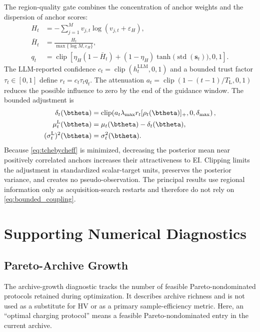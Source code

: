 The region-quality gate combines the concentration of anchor weights and the
dispersion of anchor scores:
\begin{equation}
\begin{aligned}
H_t&=-\sum_{j=1}^{M}v_{j,t}\log(v_{j,t}+\varepsilon_H),\\
\bar H_t&=\frac{H_t}{\max\{\log M,\varepsilon_H\}},\\
q_t&=\operatorname{clip}\!\left[
\eta_H(1-\bar H_t)
+(1-\eta_H)\tanh\!\bigl(\operatorname{std}(\mathbf s_t)\bigr),
0,1\right].
\end{aligned}
\label{eq:quality_gate}
\end{equation}
The LLM-reported confidence
$c_t=\operatorname{clip}(h_t^{\mathrm{LLM}},0,1)$ and a bounded trust factor
$\tau_t\in[0,1]$ define $r_t=c_t\tau_tq_t$.
The attenuation $a_t=\operatorname{clip}(1-(t-1)/T_{\mathrm L},0,1)$ reduces
the possible influence to zero by the end of the guidance window.
The bounded adjustment is
\begin{equation}
\begin{aligned}
\delta_t(\btheta)
&=\operatorname{clip}\!\left(
a_t\lambda_{\max}r_t[\rho_t(\btheta)]_+,
0,\delta_{\max}\right),\\
\mu_t^{\mathrm L}(\btheta)
&=\mu_t(\btheta)-\delta_t(\btheta),\\
(\sigma_t^{\mathrm L})^2(\btheta)&=\sigma_t^2(\btheta).
\end{aligned}
\label{eq:bounded_coupling}
\end{equation}
Because \eqref{eq:tchebycheff} is minimized, decreasing the posterior mean near
positively correlated anchors increases their attractiveness to EI.
Clipping limits the adjustment in standardized scalar-target units, preserves
the posterior variance, and creates no pseudo-observation.
The principal results use regional information only as acquisition-search
restarts and therefore do not rely on \eqref{eq:bounded_coupling}.

\section{Supporting Numerical Diagnostics}
\label{app:diagnostics}

\subsection{Pareto-Archive Growth}

The archive-growth diagnostic tracks the number of feasible
Pareto-nondominated protocols retained during optimization.
It describes archive richness and is not used as a substitute for HV or as a
primary sample-efficiency metric.
Here, an ``optimal charging protocol'' means a feasible Pareto-nondominated
entry in the current archive.

